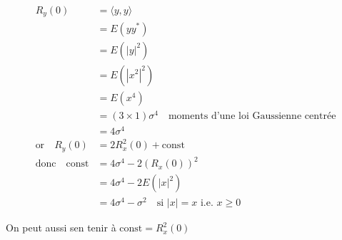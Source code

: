 \documentclass[
]{article}
\begin{document}
\begin{align*}
R_y(0) &= \langle y, y \rangle \\
&= E(yy^\ast) \\
&= E(|y|^2) \\
&= E(|x^2|^2) \\
&= E(x^4) \\
&= (3 \times 1) \sigma^4 \quad \text{moments d'une loi Gaussienne centrée} \\
&= 4\sigma^4 \\
\text{or} \quad R_y(0) &= 2R_x^2(0) + \text{const} \\
\text{donc} \quad \text{const} &= 4\sigma^4 - 2(R_x(0))^2 \\
&= 4\sigma^4 - 2E(|x|^2) \\
&= 4\sigma^4 - \sigma^2 \quad \text{si $|x| = x$ i.e. $x\geq 0$}
\end{align*}

On peut aussi s\textquotesingle en tenir à \(\text{const} = R^2_x(0)\)
\end{document}
